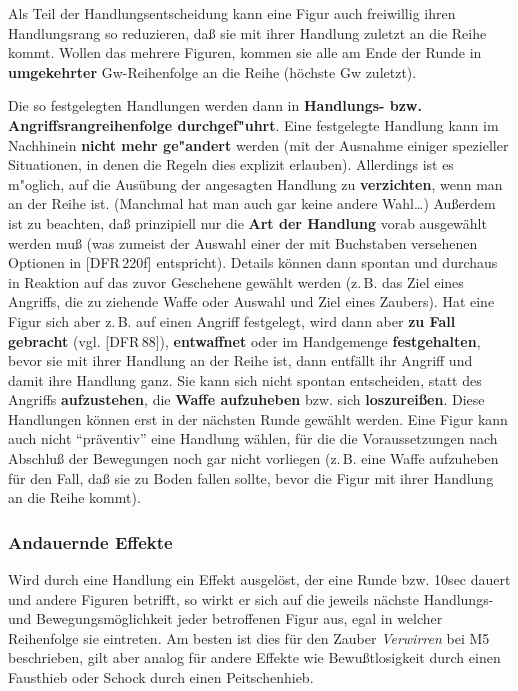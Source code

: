 \documentclass[10pt,a4paper,germanpar]{article}
\begin{document}
Als Teil der Handlungsentscheidung kann eine Figur auch freiwillig
ihren Handlungsrang so reduzieren, daß sie mit ihrer Handlung zuletzt
an die Reihe kommt. Wollen das mehrere Figuren, kommen sie alle am
Ende der Runde in \textbf{umgekehrter} Gw-Reihenfolge an die Reihe
(höchste Gw zuletzt).

Die so festgelegten Handlungen werden dann in \textbf{Handlungs-
  bzw. Angriffsrangreihenfolge durchgef"uhrt}. Eine festgelegte
Handlung kann im Nachhinein \textbf{nicht mehr ge"andert} werden (mit
der Ausnahme einiger spezieller Situationen, in denen die Regeln dies
explizit erlauben). Allerdings ist es m"oglich, auf die Ausübung der
angesagten Handlung zu \textbf{verzichten}, wenn man an der Reihe
ist. (Manchmal hat man auch gar keine andere Wahl\dots) Außerdem ist
zu beachten, daß prinzipiell nur die \textbf{Art der Handlung} vorab
ausgewählt werden muß (was zumeist der Auswahl einer der mit
Buchstaben versehenen Optionen in [DFR\,220f] entspricht). Details
können dann spontan und durchaus in Reaktion auf das zuvor Geschehene
gewählt werden (z.\,B. das Ziel eines Angriffs, die zu ziehende Waffe
oder Auswahl und Ziel eines Zaubers).
Hat eine Figur sich aber z.\,B. auf einen Angriff festgelegt, wird
dann aber \textbf{zu Fall gebracht} (vgl. [DFR\,88]),
\textbf{entwaffnet} oder im Handgemenge \textbf{festgehalten}, bevor
sie mit ihrer Handlung an der Reihe ist, dann entfällt ihr Angriff und
damit ihre Handlung ganz. Sie kann sich nicht spontan entscheiden,
statt des Angriffs \textbf{aufzustehen}, die \textbf{Waffe aufzuheben}
bzw. sich \textbf{loszureißen}. Diese Handlungen können erst in der
nächsten Runde gewählt werden. Eine Figur kann auch nicht
"`präventiv"' eine Handlung wählen, für die die Voraussetzungen nach
Abschluß der Bewegungen noch gar nicht vorliegen (z.\,B. eine Waffe
aufzuheben für den Fall, daß sie zu Boden fallen sollte, bevor die
Figur mit ihrer Handlung an die Reihe kommt).

\subsubsection{Andauernde Effekte}

Wird durch eine Handlung ein Effekt ausgelöst, der eine Runde
bzw. 10sec dauert und andere Figuren betrifft, so wirkt er sich auf
die jeweils nächste Handlungs- und Bewegungsmöglichkeit jeder
betroffenen Figur aus, egal in welcher Reihenfolge sie eintreten. Am
besten ist dies für den Zauber \emph{Verwirren} bei M5 beschrieben,
gilt aber analog für andere Effekte wie Bewußtlosigkeit durch einen
Fausthieb oder Schock durch einen Peitschenhieb.
\end{document}
